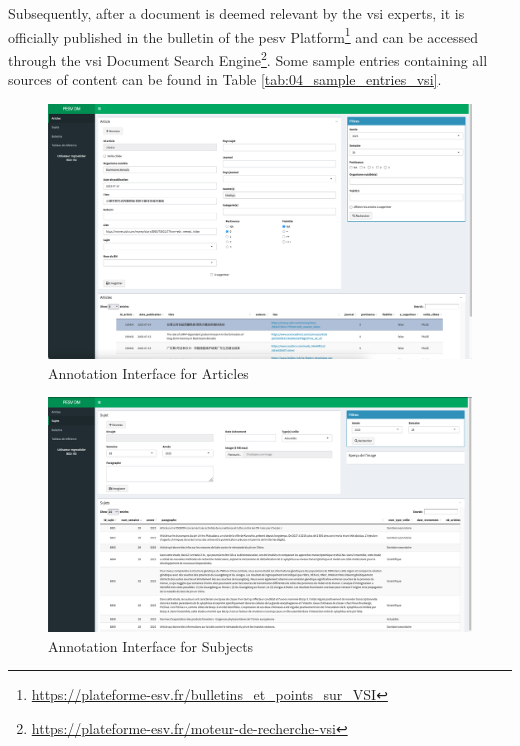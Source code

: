 Subsequently, after a document is deemed relevant by the \gls{vsi} experts, it is officially published in the bulletin of the  \gls{pesv} Platform\footnote{\url{https://plateforme-esv.fr/bulletins_et_points_sur_VSI}} and can be accessed through the \gls{vsi} Document Search Engine\footnote{\url{https://plateforme-esv.fr/moteur-de-recherche-vsi}}. Some sample entries containing all sources of content can be found in Table \ref{tab:04_sample_entries_vsi}.





\begin{landscape}
    \begin{figure}[ht]
        \centering
        \includegraphics[width=1.20\textwidth]{Figures/04/PESV_interface_1.png}
        \caption{\VSI{} Annotation Interface for Articles}
        \label{fig:04_pesv_interface_1}
    \end{figure}
\end{landscape}

\begin{landscape}
    \begin{figure}[ht]
        \centering
        \includegraphics[width=1.20\textwidth]{Figures/04/PESV_interface_2.png}
        \caption{\VSI{} Annotation Interface for Subjects}
        \label{fig:04_pesv_interface_2}
    \end{figure}
\end{landscape}


